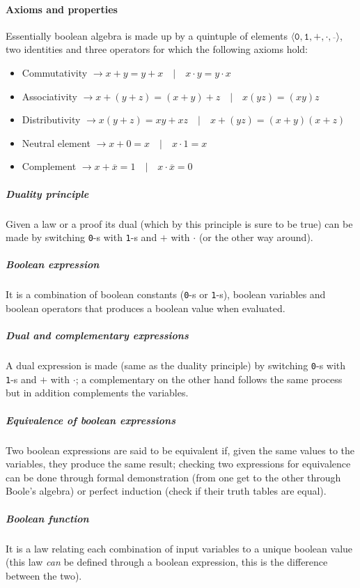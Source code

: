 \documentclass{scrartcl}
\newcommand{\zero}{\texttt{0}}
\newcommand{\one}{\texttt{1}}
\begin{document}
    \paragraph{Axioms and properties} Essentially boolean algebra is made up by a quintuple of elements $\langle \zero,\one,+,\cdot,\overline{\ }\rangle$, two identities and three operators for which the following axioms hold:
    \begin{itemize}
        \item Commutativity $\rightarrow x+y=y+x\quad|\quad x\cdot y=y\cdot x$
        \item Associativity $\rightarrow x+(y+z)=(x+y)+z\quad|\quad x(yz)=(xy)z$
        \item Distributivity $\rightarrow x(y+z)=xy+xz\quad|\quad x+(yz)=(x+y)(x+z)$
        \item Neutral element $\rightarrow x+0=x\quad|\quad x\cdot 1=x$
        \item Complement $\rightarrow x+\overline{x}=1\quad|\quad x\cdot\overline{x}=0$
    \end{itemize}
    \subparagraph{Duality principle} Given a law or a proof its dual (which by this principle is sure to be true) can be made by switching \zero-s with \one-s and $+$ with $\cdot$ (or the other way around).
    \subparagraph{Boolean expression} It is a combination of boolean constants (\zero-s or \one-s), boolean variables and boolean operators that produces a boolean value when evaluated. 
    \subparagraph{Dual and complementary expressions} A dual expression is made (same as the duality principle) by switching \zero-s with \one-s and $+$ with $\cdot$; a complementary on the other hand follows the same process but in addition complements the variables.
    \subparagraph{Equivalence of boolean expressions} Two boolean expressions are said to be equivalent if, given the same values to the variables, they produce the same result; checking two expressions for equivalence can be done through formal demonstration (from one get to the other through Boole's algebra) or perfect induction (check if their truth tables are equal).
    \subparagraph{Boolean function} It is a law relating each combination of input variables to a unique boolean value (this law \emph{can} be defined through a boolean expression, this is the difference between the two).
\end{document}
